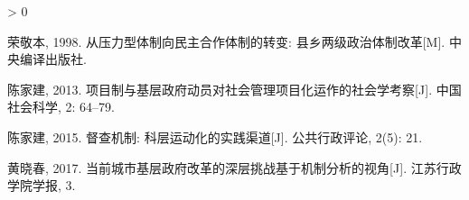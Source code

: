 \documentclass[
  12pt,
]{ctexart}
\newlength{\cslhangindent}
\newenvironment{CSLReferences}[2] %
 {%
  \setlength{\parindent}{0pt}
  \ifodd #1 \everypar{\setlength{\hangindent}{\cslhangindent}}\ignorespaces\fi
  \ifnum #2 > 0
  \setlength{\parskip}{#2\baselineskip}
  \fi
 }%
 {}
\begin{document}
\begin{CSLReferences}{1}{0}
\leavevmode\hypertarget{ref-RongJingBen1998a}{}%
荣敬本, 1998. 从压力型体制向民主合作体制的转变: 县乡两级政治体制改革{[}M{]}. {中央编译出版社}.

\leavevmode\hypertarget{ref-ChenJiaJian2013}{}%
陈家建, 2013. 项目制与基层政府动员{}{}对社会管理项目化运作的社会学考察{[}J{]}. 中国社会科学, 2: 64--79.

\leavevmode\hypertarget{ref-ChenJiaJian2015}{}%
陈家建, 2015. 督查机制: 科层运动化的实践渠道{[}J{]}. 公共行政评论, 2(5): 21.

\leavevmode\hypertarget{ref-HuangXiaoChun2017}{}%
黄晓春, 2017. 当前城市基层政府改革的深层挑战{}{}基于机制分析的视角{[}J{]}. 江苏行政学院学报, 3.

\end{CSLReferences}
\end{document}
